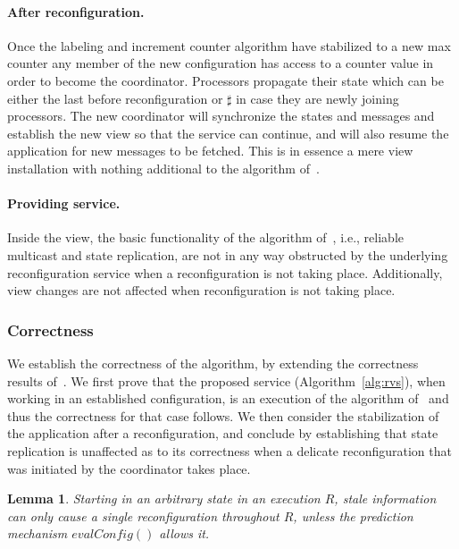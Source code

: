 \documentclass[11pt]{article}
\newtheorem{lemma}[theorem]{Lemma}
\begin{document}
\paragraph{After reconfiguration.}
Once the labeling and increment counter algorithm have stabilized to a new max counter any member of the new configuration has access to a counter value in order to become the coordinator.
Processors propagate their state which can be either the last before reconfiguration or $\sharp$ in case they are newly joining processors.
The new coordinator will synchronize the states and messages and establish the new view so that the service can continue, and will also resume the application for new messages to be fetched.
This is in essence a mere view installation with nothing additional to the algorithm of~\cite{SSVS}.

\paragraph{Providing service.} 
Inside the view, the basic functionality of the algorithm of~\cite{SSVS}, i.e., reliable multicast and state replication, are not in any way obstructed by the underlying reconfiguration service when a reconfiguration is not taking place. 
Additionally, view changes are not affected when reconfiguration is not taking place.








\subsubsection{Correctness}
We establish the correctness of the algorithm, by extending the correctness results of~\cite{SSVS}. 
We first prove that the proposed service (Algorithm~\ref{alg:rvs}), when working in an established configuration, is an execution of the algorithm of~\cite{SSVS} and thus the correctness for that case follows.
We then consider the stabilization of the application after a reconfiguration, and conclude by establishing that state replication is unaffected as to its correctness when a delicate reconfiguration that was initiated by the coordinator takes place.


\begin{lemma}
\label{thVS:noStaleRecon}
Starting in an arbitrary state in an execution $R$, stale information can only cause a single reconfiguration throughout $R$, unless the prediction mechanism $evalConfig()$ allows it. 
\end{lemma}
\end{document}
